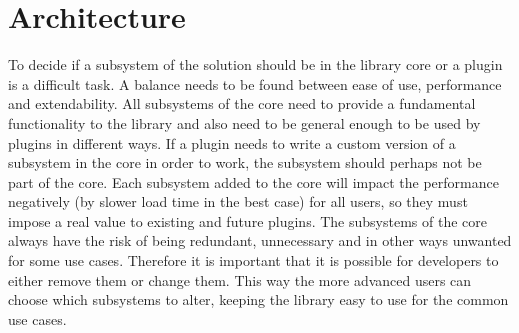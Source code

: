 \documentclass[a4paper,11pt]{kth-mag}
\begin{document}
    \section{Architecture}\label{sec:arcithecture}

      To decide if a subsystem of the solution should be in the library core or a plugin is a difficult task.
      A balance needs to be found between ease of use, performance and extendability.
      All subsystems of the core need to provide a fundamental functionality to the library and also need to be general enough to be used by plugins in different ways.
      If a plugin needs to write a custom version of a subsystem in the core in order to work, the subsystem should perhaps not be part of the core.
      Each subsystem added to the core will impact the performance negatively (by slower load time in the best case) for all users, so they must impose a real value to existing and future plugins.
      The subsystems of the core always have the risk of being redundant, unnecessary and in other ways unwanted for some use cases.
      Therefore it is important that it is possible for developers to either remove them or change them.
      This way the more advanced users can choose which subsystems to alter, keeping the library easy to use for the common use cases.

      
\end{document}

